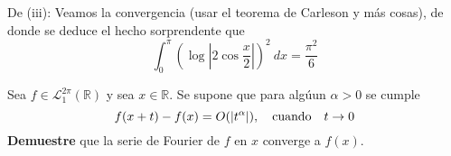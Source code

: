 \documentclass[12pt]{report}
\theoremstyle{largebreak}
\newcommand\abs[1]{\ensuremath{\left|#1\right|}}
\begin{document}
\begin{sol}
        De (iii): Veamos la convergencia (usar el teorema de Carleson y más cosas), de donde se deduce el hecho sorprendente que
        \begin{equation*}
            \int_0^{\pi}\left(\log\abs{2\cos\frac{x}{2}} \right)^2\:dx=\frac{\pi^2}{6}
        \end{equation*}
    \end{sol}

    \begin{excer}
        Sea $f\in\mathcal{L}_1^{2\pi}(\mathbb{R})$ y sea $x\in\mathbb{R}$. Se supone que para algúun $\alpha>0$ se cumple
        \begin{equation*}
            f(x+t)-f(x)=O(\abs{t^\alpha}),\quad\textup{cuando}\quad t\rightarrow 0
        \end{equation*}
        \textbf{Demuestre} que la serie de Fourier de $f$ en $x$ converge a $f(x)$.
    \end{excer}
\end{document}
